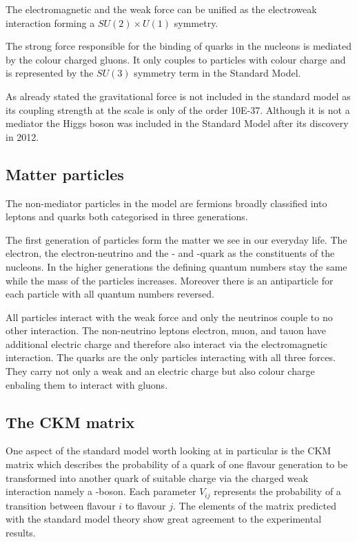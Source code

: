 The electromagnetic and the weak force can be unified as the electroweak interaction forming a $SU(2) \times U(1)$ symmetry.

The strong force responsible for the binding of quarks in the nucleons is mediated by the colour charged gluons. It only couples to particles with colour charge and is represented by the $SU(3)$ symmetry term in the Standard Model.

As already stated the gravitational force is not included in the standard model as its coupling strength at the scale is only of the order \num{10E-37}. Although it is not a mediator the Higgs boson was included in the Standard Model after its discovery in 2012.

\subsection{Matter particles}

The non-mediator particles in the model are fermions broadly classified into leptons and quarks both categorised in three generations.

The first generation of particles form the matter we see in our everyday life. The electron, the electron-neutrino and the \Pup- and \Pdown-quark as the constituents of the nucleons.
In the higher generations the defining quantum numbers stay the same while the mass of the particles increases.
Moreover there is an antiparticle for each particle with all quantum numbers reversed.

All particles interact with the weak force and only the neutrinos couple to no other interaction.
The non-neutrino leptons electron, muon, and tauon have additional electric charge and therefore also interact via the electromagnetic interaction.
The quarks are the only particles interacting with all three forces. They carry not only a weak and an electric charge but also colour charge enbaling them to interact with gluons.


\subsection{The CKM matrix}

One aspect of the standard model worth looking at in particular is the CKM matrix which describes the probability of a quark of one flavour generation to be transformed into another quark of suitable charge via the charged weak interaction namely a \PW-boson.
Each parameter $V_{ij}$ represents the probability of a transition between flavour $i$ to flavour $j$. The elements of the matrix predicted with the standard model theory show great agreement to the experimental results.~\cite{pdg}

